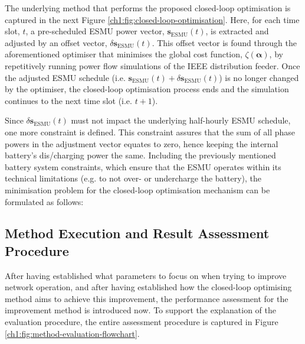 

The underlying method that performs the proposed closed-loop optimisation is captured in the next Figure \ref{ch1:fig:closed-loop-optimisation}.
Here, for each time slot, $t$, a pre-scheduled ESMU power vector, $\textbf{s}_\text{ESMU}(t)$, is extracted and adjusted by an offset vector, $\delta \textbf{s}_\text{ESMU}(t)$.
This offset vector is found through the aforementioned optimiser that minimises the global cost function, $\zeta(\boldsymbol{\alpha})$, by repetitively running power flow simulations of the IEEE distribution feeder.
Once the adjusted ESMU schedule (i.e. $\textbf{s}_\text{ESMU}(t) + \delta \textbf{s}_\text{ESMU}(t)$) is no longer changed by the optimiser, the closed-loop optimisation process ends and the simulation continues to the next time slot (i.e. $t+1$).

Since $\delta \textbf{s}_\text{ESMU}(t)$ must not impact the underlying half-hourly ESMU schedule, one more constraint is defined.
This constraint assures that the sum of all phase powers in the adjustment vector equates to zero, hence keeping the internal battery's dis/charging power the same.
Including the previously mentioned battery system constraints, which ensure that the ESMU operates within its technical limitations (e.g. to not over- or undercharge the battery), the minimisation problem for the closed-loop optimisation mechanism can be formulated as follows:




\subsection{Method Execution and Result Assessment Procedure}
\label{ch1:subsec:method-execution}

After having established what parameters to focus on when trying to improve network operation, and after having established how the closed-loop optimising method aims to achieve this improvement, the performance assessment for the improvement method is introduced now.
To support the explanation of the evaluation procedure, the entire assessment procedure is captured in Figure \ref{ch1:fig:method-evaluation-flowchart}.



